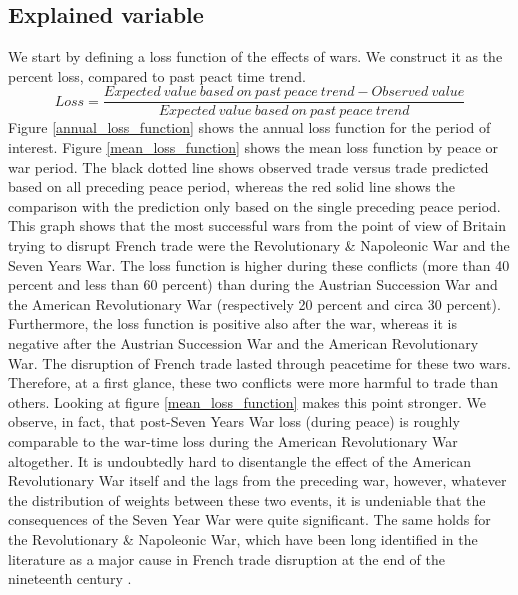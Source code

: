 \documentclass[12pt,a4paper,notitlepage,english]{article}
\begin{document}
\subsection{Explained variable}
We start by defining a loss function of the effects of wars.
We construct it as the percent loss, compared to past peact time trend.
\begin{equation*}
Loss = \frac{Expected \> value \> based \> on \>past \> peace \>trend - Observed \> value}{Expected \> value \> based \> on \>past \> peace \>trend}
\end{equation*}
Figure \ref{annual_loss_function} shows the annual loss function for the period of interest. Figure \ref{mean_loss_function} shows the mean loss function by peace or war period.
The black dotted line shows observed trade versus trade predicted based on all preceding peace period, whereas the red solid line shows the comparison with the prediction only based on the single preceding peace period.
This graph shows that the most successful wars from the point of view of Britain trying to disrupt French trade were the Revolutionary \& Napoleonic War and the Seven Years War.
The loss function is higher during these conflicts (more than 40 percent and less than 60 percent) than during the Austrian Succession War and the American Revolutionary War (respectively 20 percent and circa 30 percent).
Furthermore, the loss function is positive also after the war, whereas it is negative after the Austrian Succession War and the American Revolutionary War. The disruption of French trade lasted through peacetime for these two wars. 
Therefore, at a first glance, these two conflicts were more harmful to trade than others.
Looking at figure \ref{mean_loss_function} makes this point stronger.
We observe, in fact, that post-Seven Years War loss (during peace) is roughly comparable to the war-time loss during the American Revolutionary War altogether.
It is undoubtedly hard to disentangle the effect of the American Revolutionary War itself and the lags from the preceding war, however, whatever the distribution of weights between these two events, it is undeniable that the consequences of the Seven Year War were quite significant.
The same holds for the Revolutionary \& Napoleonic War, which have been long identified in the literature as a major cause in French trade disruption at the end of the nineteenth century \citep{o2006worldwide}.
\end{document}
